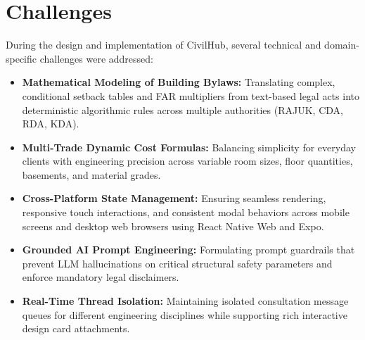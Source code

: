\documentclass[12pt,a4paper]{article}
\begin{document}
\section{Challenges}
During the design and implementation of CivilHub, several technical and domain-specific challenges were addressed:
\begin{itemize}
    \item \textbf{Mathematical Modeling of Building Bylaws:} Translating complex, conditional setback tables and FAR multipliers from text-based legal acts into deterministic algorithmic rules across multiple authorities (RAJUK, CDA, RDA, KDA).
    \item \textbf{Multi-Trade Dynamic Cost Formulas:} Balancing simplicity for everyday clients with engineering precision across variable room sizes, floor quantities, basements, and material grades.
    \item \textbf{Cross-Platform State Management:} Ensuring seamless rendering, responsive touch interactions, and consistent modal behaviors across mobile screens and desktop web browsers using React Native Web and Expo.
    \item \textbf{Grounded AI Prompt Engineering:} Formulating prompt guardrails that prevent LLM hallucinations on critical structural safety parameters and enforce mandatory legal disclaimers.
    \item \textbf{Real-Time Thread Isolation:} Maintaining isolated consultation message queues for different engineering disciplines while supporting rich interactive design card attachments.
\end{itemize}

\end{document}
